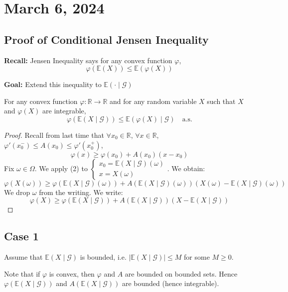 \newpage
\section{March 6, 2024}

\subsection{Proof of Conditional Jensen Inequality}

\textbf{Recall:} Jensen Inequality says for any convex function $\varphi$,
\[
\varphi(\mathbb{E}(X)) \leq \mathbb{E}(\varphi(X))
\]

\textbf{Goal:} Extend this inequality to $\mathbb{E}(\cdot \mid \mathcal{G})$

\begin{lemma}
For any convex function $\varphi: \mathbb{R} \to \mathbb{R}$ and for any random variable $X$ such that $X$ and $\varphi(X)$ are integrable,
\[
\varphi(\mathbb{E}(X \mid \mathcal{G})) \leq \mathbb{E}(\varphi(X) \mid \mathcal{G}) \quad \text{a.s.}
\]
\end{lemma}


\begin{proof}
Recall from last time that $\forall x_0 \in \mathbb{R}$, $\forall x \in \mathbb{R}$, $\varphi'(x_0^-) \leq A(x_0) \leq \varphi'(x_0^+)$,
\[
\varphi(x) \geq \varphi(x_0) + A(x_0)(x - x_0) \tag{2}
\]
Fix $\omega \in \Omega$. We apply (2) to $\begin{cases} x_0 = \mathbb{E}(X \mid \mathcal{G})(\omega) \\ x = X(\omega) \end{cases}$. We obtain:
\[
\varphi(X(\omega)) \geq \varphi(\mathbb{E}(X \mid \mathcal{G})(\omega)) + A(\mathbb{E}(X \mid \mathcal{G})(\omega))(X(\omega) - \mathbb{E}(X \mid \mathcal{G})(\omega))
\]
We drop $\omega$ from the writing. We write:
\[
\varphi(X) \geq \varphi(\mathbb{E}(X \mid \mathcal{G})) + A(\mathbb{E}(X \mid \mathcal{G}))(X - \mathbb{E}(X \mid \mathcal{G})) \tag{2}
\]
\end{proof}

\subsection*{Case 1}
Assume that $\mathbb{E}(X \mid \mathcal{G})$ is bounded, i.e. $\left| \mathbb{E}(X \mid \mathcal{G}) \right| \leq M$ for some $M \geq 0$.

Note that if $\varphi$ is convex, then $\varphi$ and $A$ are bounded on bounded sets. Hence $\varphi(\mathbb{E}(X \mid \mathcal{G}))$ and $A(\mathbb{E}(X \mid \mathcal{G}))$ are bounded (hence integrable).

